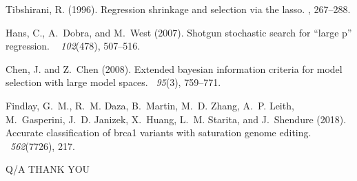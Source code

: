\documentclass[citecolor=blue,10pt]{beamer}
\newcommand{\0} {\mbox{\boldmath$0$}}
\begin{document}
\begin{frame}\footnotesize
%
%
\begin{thebibliography}{}









Tibshirani, R. (1996).
\newblock Regression shrinkage and selection via the lasso.
, 267--288.


Hans, C., A.~Dobra, and M.~West (2007).
\newblock Shotgun stochastic search for ``large p'' regression.
~{\em
  102\/}(478), 507--516.


Chen, J. and Z.~Chen (2008).
\newblock Extended bayesian information criteria for model selection with large
  model spaces.
~{\em 95\/}(3), 759--771.


Findlay, G.~M., R.~M. Daza, B.~Martin, M.~D. Zhang, A.~P. Leith, M.~Gasperini,
  J.~D. Janizek, X.~Huang, L.~M. Starita, and J.~Shendure (2018).
\newblock Accurate classification of brca1 variants with saturation genome
  editing.
~{\em 562\/}(7726), 217.

\end{thebibliography}
\end{frame}
%

\begin{frame}{Q/A}\vspace{2mm}
\centering \huge THANK YOU
\end{frame}
\end{document}
